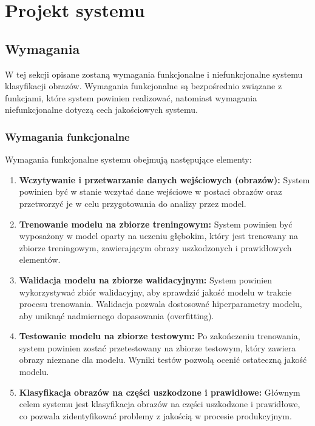 \chapter{Projekt systemu}

\section{Wymagania}

W tej sekcji opisane zostaną wymagania funkcjonalne i niefunkcjonalne systemu klasyfikacji obrazów. Wymagania funkcjonalne są bezpośrednio związane z funkcjami, które system powinien realizować, natomiast wymagania niefunkcjonalne dotyczą cech jakościowych systemu.

\subsection{Wymagania funkcjonalne}
Wymagania funkcjonalne systemu obejmują następujące elementy:

\begin{enumerate}
\item \textbf{Wczytywanie i przetwarzanie danych wejściowych (obrazów):} System powinien być w stanie wczytać dane wejściowe w postaci obrazów oraz przetworzyć je w celu przygotowania do analizy przez model.

\item \textbf{Trenowanie modelu na zbiorze treningowym:} System powinien być wyposażony w model oparty na uczeniu głębokim, który jest trenowany na zbiorze treningowym, zawierającym obrazy uszkodzonych i prawidłowych elementów.

\item \textbf{Walidacja modelu na zbiorze walidacyjnym:} System powinien wykorzystywać zbiór walidacyjny, aby sprawdzić jakość modelu w trakcie procesu trenowania. Walidacja pozwala dostosować hiperparametry modelu, aby uniknąć nadmiernego dopasowania (overfitting).

\item \textbf{Testowanie modelu na zbiorze testowym:} Po zakończeniu trenowania, system powinien zostać przetestowany na zbiorze testowym, który zawiera obrazy nieznane dla modelu. Wyniki testów pozwolą ocenić ostateczną jakość modelu.

\item \textbf{Klasyfikacja obrazów na części uszkodzone i prawidłowe:} Głównym celem systemu jest klasyfikacja obrazów na części uszkodzone i prawidłowe, co pozwala zidentyfikować problemy z jakością w procesie produkcyjnym.

\end{enumerate}

